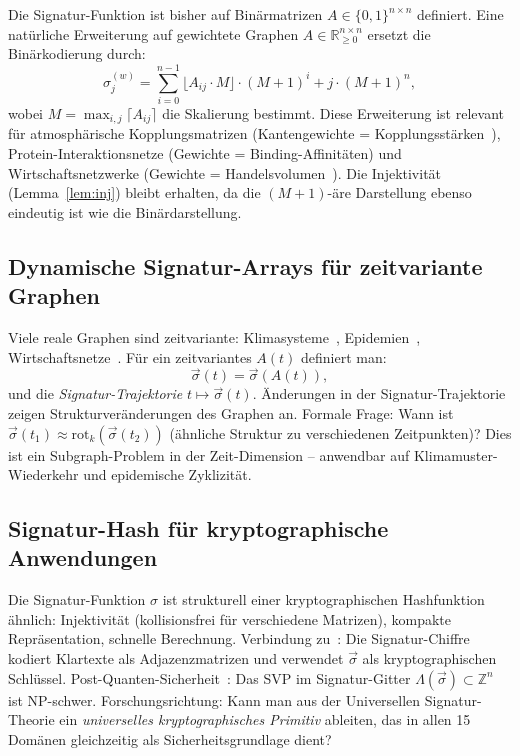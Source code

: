 ﻿\documentclass[a4paper,12pt]{article}
\theoremstyle{definition}
\begin{document}
Die Signatur-Funktion ist bisher auf Bin\"armatrizen $A \in \{0,1\}^{n\times n}$
definiert. Eine nat\"urliche Erweiterung auf gewichtete Graphen
$A \in \mathbb{R}_{\geq 0}^{n\times n}$ ersetzt die Bin\"arkodierung durch:
\[
\sigma_j^{(w)} = \sum_{i=0}^{n-1} \lfloor A_{ij} \cdot M \rfloor \cdot (M+1)^i
+ j \cdot (M+1)^n,
\]
wobei $M = \max_{i,j} \lceil A_{ij} \rceil$ die Skalierung bestimmt.
Diese Erweiterung ist relevant f\"ur atmosph\"arische Kopplungsmatrizen
(Kantengewichte = Kopplungsst\"arken~\cite{epp2026klima}),
Protein-Interaktionsnetze (Gewichte = Binding-Affinit\"aten) und
Wirtschaftsnetzwerke (Gewichte = Handelsvolumen~\cite{epp2026spieltheorie}).
Die Injektivit\"at (Lemma~\ref{lem:inj}) bleibt erhalten, da die
$(M+1)$-\"are Darstellung ebenso eindeutig ist wie die Bin\"ardarstellung.

\subsection{Dynamische Signatur-Arrays f\"ur zeitvariante Graphen}

Viele reale Graphen sind zeitvariante: Klimasysteme~\cite{epp2026klima},
Epidemien~\cite{epp2026hantavirus}, Wirtschaftsnetze~\cite{epp2026spieltheorie}.
F\"ur ein zeitvariantes $A(t)$ definiert man:
\[
\vec{\sigma}(t) = \vec{\sigma}(A(t)),
\]
und die \emph{Signatur-Trajektorie} $t \mapsto \vec{\sigma}(t)$.
\"Anderungen in der Signatur-Trajektorie zeigen Strukturver\"anderungen des Graphen an.
Formale Frage: Wann ist $\vec{\sigma}(t_1) \approx \mathrm{rot}_k(\vec{\sigma}(t_2))$
(\"ahnliche Struktur zu verschiedenen Zeitpunkten)?
Dies ist ein Subgraph-Problem in der Zeit-Dimension -- anwendbar auf
Klimamuster-Wiederkehr und epidemische Zyklizit\"at.

\subsection{Signatur-Hash f\"ur kryptographische Anwendungen}

Die Signatur-Funktion $\sigma$ ist strukturell einer kryptographischen
Hashfunktion \"ahnlich: Injektivit\"at (kollisionsfrei f\"ur verschiedene
Matrizen), kompakte Repr\"asentation, schnelle Berechnung.
Verbindung zu~\cite{epp2026sigchiffre,epp2026pqc}:
Die Signatur-Chiffre kodiert Klartexte als Adjazenzmatrizen und verwendet
$\vec{\sigma}$ als kryptographischen Schl\"ussel.
Post-Quanten-Sicherheit~\cite{epp2026lattice}: Das SVP im Signatur-Gitter
$\Lambda(\vec{\sigma}) \subset \mathbb{Z}^n$ ist NP-schwer.
Forschungsrichtung: Kann man aus der Universellen Signatur-Theorie ein
\emph{universelles kryptographisches Primitiv} ableiten, das in allen 15 Domänen
gleichzeitig als Sicherheitsgrundlage dient?
\end{document}
